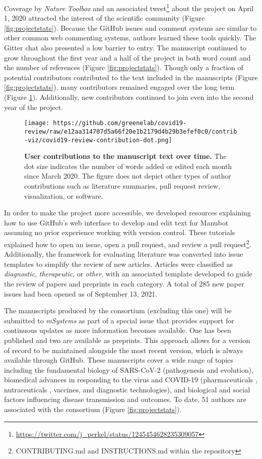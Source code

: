 \documentclass[twocolumn]{ceurart}
\begin{document}
Coverage by \emph{Nature Toolbox} \citep{AE0QcVgJ} and an associated tweet\footnote{\url{https://twitter.com/j_perkel/status/1245454628235309057}} about the project on April 1, 2020 attracted the interest of the scientific community (Figure \ref{fig:projectstats}).
Because the GitHub issues and comment systems are similar to other common web commenting systems, authors learned these tools quickly.
The Gitter chat also presented a low barrier to entry.
The manuscript continued to grow throughout the first year and a half of the project in both word count and the number of references (Figure \ref{fig:projectstats}).
Though only a fraction of potential contributors contributed to the text included in the manuscripts (Figure \ref{fig:projectstats}), many contributors remained engaged over the long term (Figure \ref{fig:projectdots}).
Additionally, new contributors continued to join even into the second year of the project.

\begin{figure}
\hypertarget{fig:projectdots}{%
\centering
\texttt{[image: https://github.com/greenelab/covid19-review/raw/e12aa314707d5a66f20e1b2179d4b29b3efef0c0/contrib-viz/covid19-review-contribution-dot.png]}
\caption{\textbf{User contributions to the manuscript text over time.}
The dot size indicates the number of words added or edited each month since March 2020.
The figure does not depict other types of author contributions such as literature summaries, pull request review, visualization, or software.}\label{fig:projectdots}
}
\end{figure}

In order to make the project more accessible, we developed resources explaining how to use GitHub's web interface to develop and edit text for Manubot assuming no prior experience working with version control.
These tutorials explained how to open an issue, open a pull request, and review a pull request\footnote{CONTRIBUTING.md and INSTRUCTIONS.md within the
  repository}.
Additionally, the framework for evaluating literature was converted into issue templates to simplify the review of new articles.
Articles were classified as \emph{diagnostic}, \emph{therapeutic}, or \emph{other}, with an associated template developed to guide the review of papers and preprints in each category.
A total of 285 new paper issues had been opened as of September 13, 2021.

The manuscripts produced by the consortium (excluding this one) will be submitted to \emph{mSystems} as part of a special issue that provides support for continuous updates as more information becomes available.
One has been published and two are available as preprints.
This approach allows for a version of record to be maintained alongside the most recent version, which is always available through GitHub.
These manuscripts cover a wide range of topics including the fundamental biology of SARS-CoV-2 (pathogenesis \citep{GdZc4Yyd} and evolution), biomedical advances in responding to the virus and COVID-19 (pharmaceuticals \citep{njpLhBui}, nutraceuticals \citep{wgAGKcBj}, vaccines, and diagnostic technologies), and biological and social factors influencing disease transmission and outcomes.
To date, 51 authors are associated with the consortium (Figure \ref{fig:projectstats}).
\end{document}
